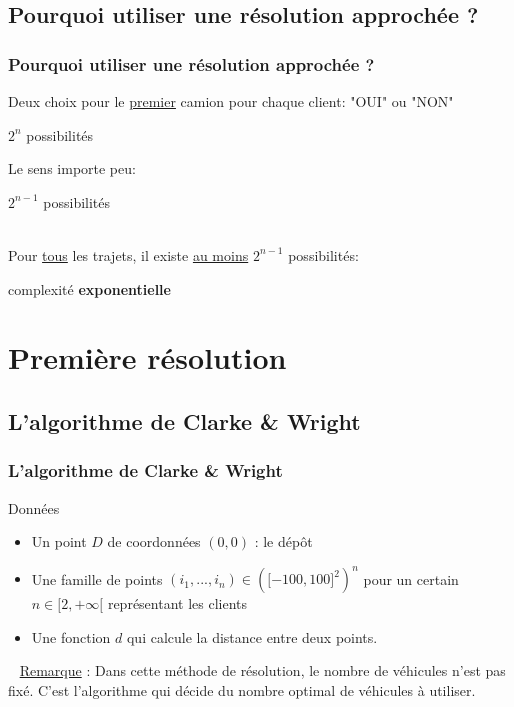 \documentclass[10pt]{beamer}
\begin{document}
	\subsection{Pourquoi utiliser une résolution approchée ?}

	\begin{frame}
		\frametitle{Pourquoi utiliser une résolution approchée ?}
		Deux choix pour le \underline{premier} camion pour chaque client: "OUI" ou "NON"
		\pause
		\begin{center}
			$2^n$ possibilités
		\end{center}
		\pause
		Le sens importe peu:
		\begin{center}
			$2^{n-1}$ possibilités
		\end{center}
		\pause
		\ \\Pour \underline{tous} les trajets, il existe \underline{au moins} $2^{n-1}$ possibilités: \pause 
		\begin{center}
			complexité \textbf{exponentielle}
		\end{center}
	\end{frame}

	\section{Première résolution}

	\subsection{L'algorithme de Clarke \& Wright}

	\begin{frame}
		\frametitle{L'algorithme de Clarke \& Wright}
		\begin{beamerboxesrounded}[upper=data_up,lower=data_low,shadow=true]{Données}
			\begin{itemize}[label=-]
				\item Un point $D$ de coordonnées $(0,0)$ : le dépôt
				\pause
				\item Une famille de points \((i_1,...,i_n) \in {(\lbrack-100,100\rbrack^2)}^n\) pour un certain $n \in \lbrack2,+\infty\lbrack$ représentant les clients
				\pause
				\item Une fonction $d$ qui calcule la distance entre deux points.
				\pause
			\end{itemize}
		\end{beamerboxesrounded}\ \newline
		\underline{Remarque} : Dans cette méthode de résolution, le nombre de véhicules n'est pas fixé. C'est l'algorithme qui décide du nombre optimal de véhicules à utiliser. 
	\end{frame}
	 
\end{document}

